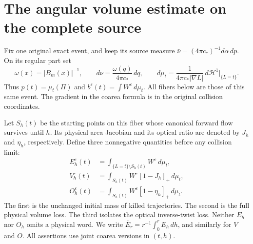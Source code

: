 \section{The angular volume estimate on the complete source}
\label{sec:v79-volume}
Fix one original exact event, and keep its source measure
$\bar\nu=(4\pi c_*)^{-1}d\alpha\,dp$. On its regular part set
\[
 \omega(x)=|B_m(x)|^{-1},\qquad
 d\bar\nu=\frac{\omega(q)}{4\pi c_*}\,dq,\qquad
 d\mu_t=\frac{1}{4\pi c_*|\nabla L|}\,d\mathcal H^1|_{\{L=t\}}.
\]
Thus $p(t)=\mu_t(\Pi)$ and $b^\varepsilon(t)=\int W^\varepsilon\,d\mu_t$.
All fibers below are those of this same event. The gradient in the
coarea formula is in the original collision coordinates.

Let $S_h(t)$ be the starting points on this fiber whose canonical
forward flow survives until $h$. Its physical area Jacobian and its
optical ratio are denoted by $J_h$ and $\eta_h$, respectively. Define
three nonnegative quantities before any collision limit:
\begin{align}
 E_h^\varepsilon(t)&=\int_{\{L=t\}\setminus S_h(t)}W^\varepsilon\,d\mu_t,
                                                   \label{eq:v79-exit}\\
 V_h^\varepsilon(t)&=\int_{S_h(t)}W^\varepsilon[1-J_h]_+\,d\mu_t,
                                                   \label{eq:v79-volume}\\
 O_h^\varepsilon(t)&=\int_{S_h(t)}W^\varepsilon[1-\eta_h]_+\,d\mu_t.
                                                   \label{eq:v79-optical-loss}
\end{align}
The first is the unchanged initial mass of killed trajectories. The
second is the full physical volume loss. The third isolates the
optical inverse-twist loss. Neither $E_h$ nor $O_h$ omits a physical
word. We write $\bar E_r=r^{-1}\int_0^rE_h\,dh$, and similarly for
$V$ and $O$. All assertions use joint coarea versions in $(t,h)$.

